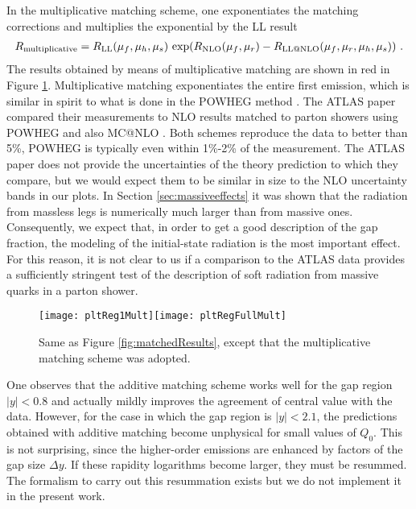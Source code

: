 \documentclass[11pt,a4paper]{article}
\begin{document}
In the multiplicative matching scheme, one exponentiates the matching corrections and multiplies the exponential by the LL result
 \begin{align}\label{eq:matchingMult}
R_{\text{multiplicative}}=R_{\rm LL}(\mu_f,\mu_h,\mu_s)\, \exp\!\left( R_{\rm NLO}(\mu_f,\mu_r)-R_{\rm LL @ NLO}(\mu_f,\mu_r,\mu_h,\mu_s)\right)\, .
\end{align}
The results obtained by means of multiplicative matching  are shown in red in Figure \ref{fig:matchedResultsMult}. Multiplicative matching exponentiates the entire first emission, which is similar in spirit to what is done in the {\sc POWHEG} method \cite{Frixione:2007vw,Alioli:2010xd}.  The ATLAS paper compared their measurements to NLO results matched to parton showers using {\sc POWHEG} and also {\sc MC@NLO} \cite{Frixione:2002ik,Frixione:2003ei}. Both schemes reproduce the data to better than 5\%, {\sc POWHEG} is typically even within 1\%-2\% of the measurement. The ATLAS paper does not provide the uncertainties of the theory prediction to which they compare, but we would expect them to be similar in size to the NLO uncertainty bands in our plots. In Section \ref{sec:massiveeffects} it was shown that the radiation from massless legs is numerically much larger than from massive ones. Consequently, we expect that, in order to get a good description of the gap fraction, the modeling of the  initial-state radiation is the most important effect. 
	For this reason, it is not clear to us if a comparison to the ATLAS data provides a sufficiently stringent test of the description of soft radiation from massive quarks in a parton shower.
	



\begin{figure}[t]
	\centering
	\texttt{[image: pltReg1Mult]}\texttt{[image: pltRegFullMult]}
	\caption{Same as Figure \ref{fig:matchedResults}, except that the multiplicative matching scheme was adopted.\label{fig:matchedResultsMult}}
\end{figure}


One observes that the additive matching scheme works well for the gap region $|y|<0.8$ and actually mildly improves the agreement of central value with the data. However, for the case in which the gap region is $|y|<2.1$, the predictions obtained with additive matching become unphysical for small values of $Q_0$. This is not surprising, since the higher-order emissions are enhanced by factors of the gap size $\Delta y$. If these rapidity logarithms become larger, they must be resummed. The formalism to carry out this resummation exists \cite{Becher:2015hka,Becher:2016mmh} but we do not implement it in the present work. 
\end{document}
